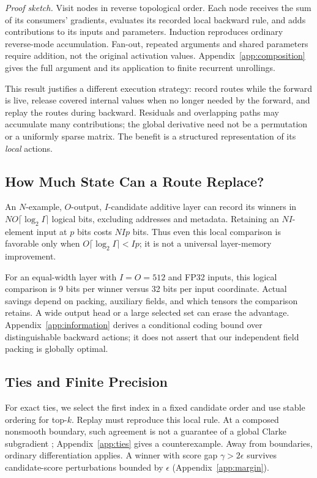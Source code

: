 \documentclass{article}
\theoremstyle{plain}
\theoremstyle{definition}
\theoremstyle{remark}
\begin{document}
\noindent\emph{Proof sketch.} Visit nodes in reverse topological order.
Each node receives the sum of its consumers' gradients, evaluates its
recorded local backward rule, and adds contributions to its inputs and
parameters. Induction reproduces ordinary reverse-mode accumulation.
Fan-out, repeated arguments and shared parameters require addition, not
the original activation values. Appendix~\ref{app:composition} gives the
full argument and its application to finite recurrent unrollings.

This result justifies a different execution strategy: record routes while
the forward is live, release covered internal values when no longer
needed by the forward, and replay the routes during backward. Residuals
and overlapping paths may accumulate many contributions; the global
derivative need not be a permutation or a uniformly sparse matrix.
The benefit is a structured representation of its \emph{local} actions.

\subsection{How Much State Can a Route Replace?}

An $N$-example, $O$-output, $I$-candidate additive layer can record its winners
in $NO\lceil\log_2 I\rceil$ logical bits, excluding addresses and metadata.
Retaining an $NI$-element input at $p$ bits costs $NIp$ bits. Thus even this
local comparison is favorable only when
$O\lceil\log_2 I\rceil<Ip$; it is not a universal layer-memory improvement.

For an equal-width layer with $I=O=512$ and FP32 inputs, this logical
comparison is 9 bits per winner versus 32 bits per input coordinate.
Actual savings depend on packing, auxiliary fields, and which tensors the
comparison retains. A wide output head or a large selected set can erase
the advantage. Appendix~\ref{app:information} derives a conditional coding
bound over distinguishable backward actions; it does not assert that our
independent field packing is globally optimal.

\subsection{Ties and Finite Precision}

For exact ties, we select the first index in a fixed candidate order and
use stable ordering for top-$k$. Replay must reproduce this local rule.
At a composed nonsmooth boundary, such agreement is not a guarantee of a
global Clarke subgradient \citep{bolte2020model,bolte2023nonsmooth};
Appendix~\ref{app:ties} gives a counterexample. Away from boundaries,
ordinary differentiation applies. A winner with score gap
$\gamma>2\epsilon$ survives candidate-score perturbations bounded by
$\epsilon$ (Appendix~\ref{app:margin}).
\end{document}
